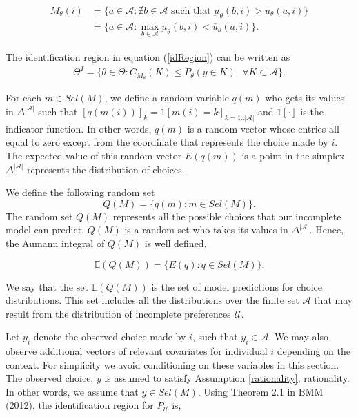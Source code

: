 \documentclass[reqno]{article}
\begin{document}
\begin{align}
\begin{split}
M_{\theta}(i) &=\{a \in \mathcal{A} : \nexists b \in \mathcal{A} \text{ such that } \underbar{u}_{\theta}(b,i)> \bar{u}_{\theta}(a,i) \} \\
&= \{a \in \mathcal{A} : \max\limits_{b \in \mathcal{A}} \underbar{u}_{\theta}(b,i) <  \bar{u}_{\theta}(a,i) \}.
\end{split}
\end{align}

The identification region in equation (\ref{idRegion}) can be written as
\begin{align}
    \Theta^{I} = \{ \theta \in \Theta : C_{M_{\theta}}(K)\leq P_{\theta}(y\in K) \text{ } \forall K\subset \mathcal{A} \}\text{.}
\end{align}

For each $m \in Sel(M)$, we define a random variable $q(m)$ who gets its values in $ \Delta^{| \mathcal{A} |}$ such that $[q(m(i))]_k=1[m(i)=k]_{k=1.. | \mathcal{A} |}$ and $1[\cdot]$ is the indicator function. In other words, $q(m)$ is a random vector whose entries all equal to zero except from the coordinate that represents the choice made by $i$. The expected value of this random vector $E(q(m))$ is a point in the simplex $\Delta^{| \mathcal{A} |}$ represents the distribution of choices.

We define the following random set 
\begin{equation}
    Q(M) = \{ q(m) : m \in Sel(M) \}.
\end{equation}
The random set $Q(M)$ represents all the possible choices that our incomplete model can predict. $Q(M)$ is a random set who takes its values in $\Delta^{| \mathcal{A} |}$. Hence, the Aumann integral of $Q(M)$ is well defined,

\begin{equation}
    \mathbb{E}(Q(M)) = \{E(q) : q \in Sel(M)\}.
\end{equation}

We say that the set $\mathbb{E}(Q(M))$ is the set of model predictions for choice distributions. This set includes all the distributions over the finite set $\mathcal{A}$ that may result from the distribution of incomplete preferences $\mathcal{U}$. 

Let $y_{i}$ denote the observed choice made by $i$, such that $y_{i}\in \mathcal{A}$. We may also observe additional vectors of relevant covariates for individual $i$ depending on the context. For simplicity we avoid conditioning on these variables in this section. The observed choice, $y$ is assumed to satisfy Assumption \ref{rationality}, rationality. In other words, we assume that $y \in Sel(M)$. Using Theorem 2.1 in BMM (2012), the identification region for $P_{\mathcal{U}}$ is, 
\end{document}
